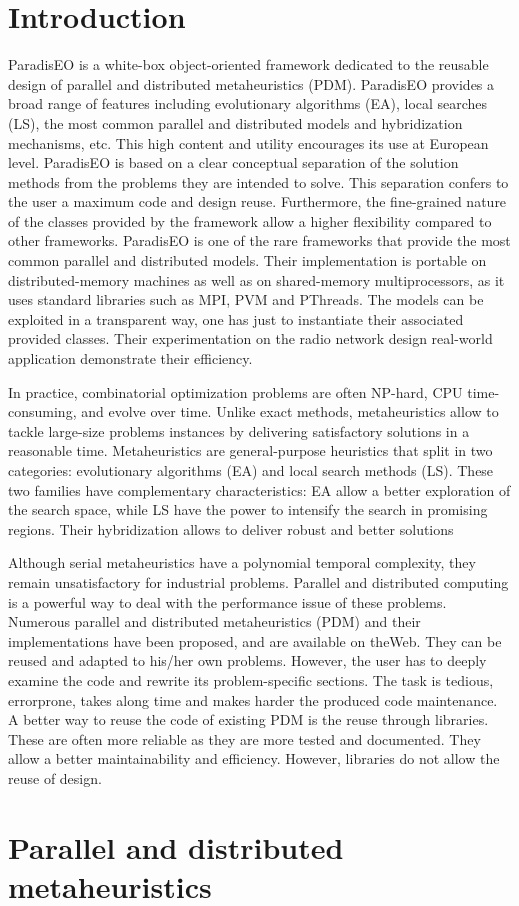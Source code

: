 \section{Introduction}\label{main_intro}
Paradis\-EO is a white-box object-oriented framework dedicated to the reusable design of parallel and distributed metaheuristics (PDM). Paradis\-EO provides a broad range of features including evolutionary algorithms (EA), local searches (LS), the most common parallel and distributed models and hybridization mechanisms, etc. This high content and utility encourages its use at European level. Paradis\-EO is based on a clear conceptual separation of the solution methods from the problems they are intended to solve. This separation confers to the user a maximum code and design reuse. Furthermore, the fine-grained nature of the classes provided by the framework allow a higher flexibility compared to other frameworks. Paradis\-EO is one of the rare frameworks that provide the most common parallel and distributed models. Their implementation is portable on distributed-memory machines as well as on shared-memory multiprocessors, as it uses standard libraries such as MPI, PVM and PThreads. The models can be exploited in a transparent way, one has just to instantiate their associated provided classes. Their experimentation on the radio network design real-world application demonstrate their efficiency.

In practice, combinatorial optimization problems are often NP-hard, CPU time-consuming, and evolve over time. Unlike exact methods, metaheuristics allow to tackle large-size problems instances by delivering satisfactory solutions in a reasonable time. Metaheuristics are general-purpose heuristics that split in two categories: evolutionary algorithms (EA) and local search methods (LS). These two families have complementary characteristics: EA allow a better exploration of the search space, while LS have the power to intensify the search in promising regions. Their hybridization allows to deliver robust and better solutions

Although serial metaheuristics have a polynomial temporal complexity, they remain unsatisfactory for industrial problems. Parallel and distributed computing is a powerful way to deal with the performance issue of these problems. Numerous parallel and distributed metaheuristics (PDM) and their implementations have been proposed, and are available on the\-Web. They can be reused and adapted to his/her own problems. However, the user has to deeply examine the code and rewrite its problem-specific sections. The task is tedious, errorprone, takes along time and makes harder the produced code maintenance. A better way to reuse the code of existing PDM is the reuse through libraries. These are often more reliable as they are more tested and documented. They allow a better maintainability and efficiency. However, libraries do not allow the reuse of design.\section{Parallel and distributed metaheuristics}\label{main_parallel_metaheuristics}
